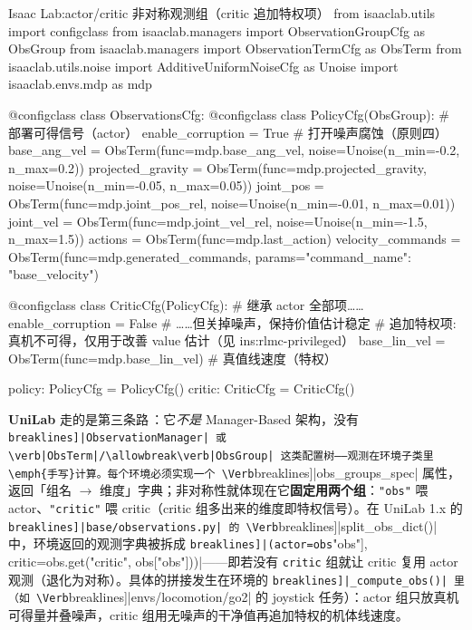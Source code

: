 \begin{codebox}[Python]{Isaac Lab:actor/critic 非对称观测组（critic 追加特权项）}
from isaaclab.utils import configclass
from isaaclab.managers import ObservationGroupCfg as ObsGroup
from isaaclab.managers import ObservationTermCfg as ObsTerm
from isaaclab.utils.noise import AdditiveUniformNoiseCfg as Unoise
import isaaclab.envs.mdp as mdp

@configclass
class ObservationsCfg:
    @configclass
    class PolicyCfg(ObsGroup):           # 部署可得信号（actor）
        enable_corruption = True          # 打开噪声腐蚀（原则四）
        base_ang_vel = ObsTerm(func=mdp.base_ang_vel,
                               noise=Unoise(n_min=-0.2, n_max=0.2))
        projected_gravity = ObsTerm(func=mdp.projected_gravity,
                                    noise=Unoise(n_min=-0.05, n_max=0.05))
        joint_pos = ObsTerm(func=mdp.joint_pos_rel,
                            noise=Unoise(n_min=-0.01, n_max=0.01))
        joint_vel = ObsTerm(func=mdp.joint_vel_rel,
                            noise=Unoise(n_min=-1.5, n_max=1.5))
        actions = ObsTerm(func=mdp.last_action)
        velocity_commands = ObsTerm(func=mdp.generated_commands,
                                    params={"command_name": "base_velocity"})

    @configclass
    class CriticCfg(PolicyCfg):           # 继承 actor 全部项……
        enable_corruption = False         # ……但关掉噪声，保持价值估计稳定
        # 追加特权项:真机不可得，仅用于改善 value 估计（见 ins:rlmc-privileged）
        base_lin_vel = ObsTerm(func=mdp.base_lin_vel)   # 真值线速度（特权）

    policy: PolicyCfg = PolicyCfg()
    critic: CriticCfg = CriticCfg()
\end{codebox}

\textbf{UniLab} 走的是第三条路\,\cite{unilab2026}：它\emph{不是} Manager-Based 架构，没有 \Verb[breaklines]|ObservationManager| 或 \verb|ObsTerm|/\allowbreak\verb|ObsGroup| 这类配置树——观测在环境子类里\emph{手写}计算。每个环境必须实现一个 \Verb[breaklines]|obs_groups_spec| 属性，返回「组名 $\to$ 维度」字典；非对称性就体现在它\textbf{固定用两个组}：\verb|"obs"| 喂 actor、\verb|"critic"| 喂 critic（critic 组多出来的维度即特权信号）。在 UniLab 1.x 的 \Verb[breaklines]|base/observations.py| 的 \Verb[breaklines]|split_obs_dict()| 中，环境返回的观测字典被拆成 \Verb[breaklines]|(actor=obs["obs"], critic=obs.get("critic", obs["obs"]))|——即若没有 \verb|critic| 组就让 critic 复用 actor 观测（退化为对称）。具体的拼接发生在环境的 \Verb[breaklines]|_compute_obs()| 里（如 \Verb[breaklines]|envs/locomotion/go2| 的 joystick 任务）：actor 组只放真机可得量并叠噪声，critic 组用无噪声的干净值再追加特权的机体线速度。

